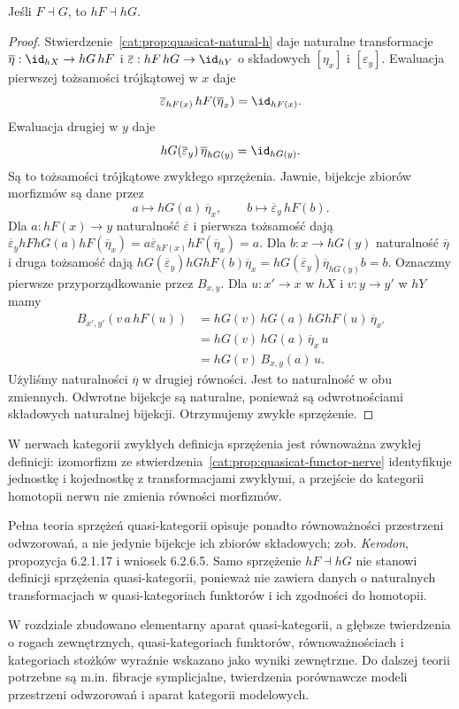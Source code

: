 \begin{stwierdzenie}\label{cat:prop:quasicat-h-adjunction}
Jeśli $F\dashv G$, to $hF\dashv hG$.
\end{stwierdzenie}
\begin{proof}
Stwierdzenie~\ref{cat:prop:quasicat-natural-h} daje naturalne transformacje $\overline\eta:\id_{hX}\to hG\,hF$ i $\overline\varepsilon:hF\,hG\to\id_{hY}$ o składowych $[\eta_x]$ i $[\varepsilon_y]$. Ewaluacja pierwszej tożsamości trójkątowej w $x$ daje
\[
 \overline\varepsilon_{hF(x)}\,hF(\overline\eta_x)=\id_{hF(x)}.
\]
Ewaluacja drugiej w $y$ daje
\[
 hG(\overline\varepsilon_y)\,\overline\eta_{hG(y)}=\id_{hG(y)}.
\]
Są to tożsamości trójkątowe zwykłego sprzężenia. Jawnie, bijekcje zbiorów morfizmów są dane przez
\[
 a\longmapsto hG(a)\,\overline\eta_x,\qquad
 b\longmapsto\overline\varepsilon_y\,hF(b).
\]
Dla $a:hF(x)\to y$ naturalność $\overline\varepsilon$ i pierwsza tożsamość dają
$\overline\varepsilon_y hFhG(a)hF(\overline\eta_x)=a\overline\varepsilon_{hF(x)}hF(\overline\eta_x)=a$.
Dla $b:x\to hG(y)$ naturalność $\overline\eta$ i druga tożsamość dają
$hG(\overline\varepsilon_y)hGhF(b)\overline\eta_x=hG(\overline\varepsilon_y)\overline\eta_{hG(y)}b=b$.
Oznaczmy pierwsze przyporządkowanie przez $B_{x,y}$. Dla $u:x'\to x$ w $hX$ i $v:y\to y'$ w $hY$ mamy
\[
\begin{aligned}
 B_{x',y'}(v\,a\,hF(u))
 &=hG(v)\,hG(a)\,hGhF(u)\,\overline\eta_{x'}\\
 &=hG(v)\,hG(a)\,\overline\eta_x\,u\\
 &=hG(v)\,B_{x,y}(a)\,u.
\end{aligned}
\]
Użyliśmy naturalności $\overline\eta$ w drugiej równości. Jest to naturalność w obu zmiennych. Odwrotne bijekcje są naturalne, ponieważ są odwrotnościami składowych naturalnej bijekcji. Otrzymujemy zwykłe sprzężenie.
\end{proof}

W nerwach kategorii zwykłych definicja sprzężenia jest równoważna zwykłej definicji: izomorfizm ze stwierdzenia~\ref{cat:prop:quasicat-functor-nerve} identyfikuje jednostkę i kojednostkę z transformacjami zwykłymi, a przejście do kategorii homotopii nerwu nie zmienia równości morfizmów.

Pełna teoria sprzężeń quasi-kategorii opisuje ponadto równoważności przestrzeni odwzorowań, a nie jedynie bijekcje ich zbiorów składowych; zob. \emph{Kerodon}, propozycja 6.2.1.17 i wniosek 6.2.6.5. Samo sprzężenie $hF\dashv hG$ nie stanowi definicji sprzężenia quasi-kategorii, ponieważ nie zawiera danych o naturalnych transformacjach w quasi-kategoriach funktorów i ich zgodności do homotopii.

\medskip
W rozdziale zbudowano elementarny aparat quasi-kategorii, a głębsze twierdzenia o rogach zewnętrznych, quasi-kategoriach funktorów, równoważnościach i kategoriach stożków wyraźnie wskazano jako wyniki zewnętrzne. Do dalszej teorii potrzebne są m.in. fibracje symplicjalne, twierdzenia porównawcze modeli przestrzeni odwzorowań i aparat kategorii modelowych.
